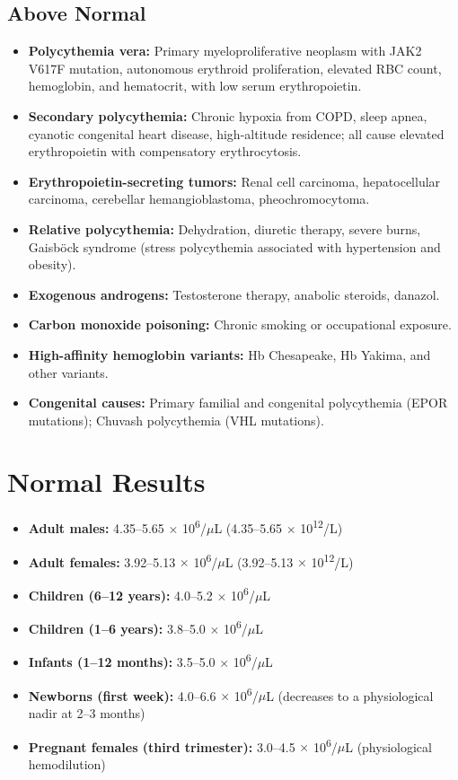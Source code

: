 \subsection*{Above Normal}
\begin{itemize}
  \item \textbf{Polycythemia vera:} Primary myeloproliferative neoplasm with JAK2 V617F mutation, autonomous erythroid proliferation, elevated RBC count, hemoglobin, and hematocrit, with low serum erythropoietin.
  \item \textbf{Secondary polycythemia:} Chronic hypoxia from COPD, sleep apnea, cyanotic congenital heart disease, high-altitude residence; all cause elevated erythropoietin with compensatory erythrocytosis.
  \item \textbf{Erythropoietin-secreting tumors:} Renal cell carcinoma, hepatocellular carcinoma, cerebellar hemangioblastoma, pheochromocytoma.
  \item \textbf{Relative polycythemia:} Dehydration, diuretic therapy, severe burns, Gaisb\"{o}ck syndrome (stress polycythemia associated with hypertension and obesity).
  \item \textbf{Exogenous androgens:} Testosterone therapy, anabolic steroids, danazol.
  \item \textbf{Carbon monoxide poisoning:} Chronic smoking or occupational exposure.
  \item \textbf{High-affinity hemoglobin variants:} Hb Chesapeake, Hb Yakima, and other variants.
  \item \textbf{Congenital causes:} Primary familial and congenital polycythemia (EPOR mutations); Chuvash polycythemia (VHL mutations).
\end{itemize}

\section*{Normal Results}
\begin{itemize}
  \item \textbf{Adult males:} 4.35--5.65 $\times$ 10\textsuperscript{6}/$\mu$L (4.35--5.65 $\times$ 10\textsuperscript{12}/L)
  \item \textbf{Adult females:} 3.92--5.13 $\times$ 10\textsuperscript{6}/$\mu$L (3.92--5.13 $\times$ 10\textsuperscript{12}/L)
  \item \textbf{Children (6--12 years):} 4.0--5.2 $\times$ 10\textsuperscript{6}/$\mu$L
  \item \textbf{Children (1--6 years):} 3.8--5.0 $\times$ 10\textsuperscript{6}/$\mu$L
  \item \textbf{Infants (1--12 months):} 3.5--5.0 $\times$ 10\textsuperscript{6}/$\mu$L
  \item \textbf{Newborns (first week):} 4.0--6.6 $\times$ 10\textsuperscript{6}/$\mu$L (decreases to a physiological nadir at 2--3 months)
  \item \textbf{Pregnant females (third trimester):} 3.0--4.5 $\times$ 10\textsuperscript{6}/$\mu$L (physiological hemodilution)
\end{itemize}

